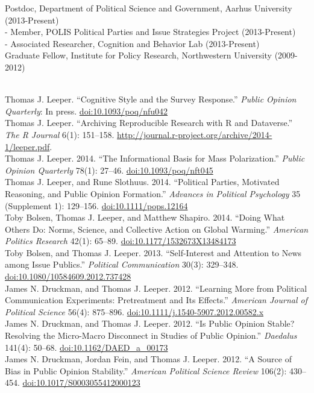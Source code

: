 \documentclass[12pt]{article}
\renewcommand{\section}[1]{\pagebreak[3]%
    \llap{\scshape\smash{\parbox[t]{\marginparwidth}{\raggedright {\color{lg}#1}}}}%
    \vspace{-\baselineskip}\par}
\newcommand{\topic}[1]{\pagebreak[3]\indent {\color{lg}{\footnotesize #1 }}\\}
\newcommand{\entry}[1]{\indent {\color{lg}\guillemotright}\hspace{2pt}#1\vspace{.25em}\\}
\newcommand{\subentry}[1]{{\color{lg}-} #1\vspace{.25em}\\}
\begin{document}
\section{Academic Appointments}
\entry{Postdoc, Department of Political Science and Government, Aarhus University (2013-Present)}
\subentry{Member, POLIS Political Parties and Issue Strategies Project (2013-Present)}
\subentry{Associated Researcher, Cognition and Behavior Lab (2013-Present)}
\entry{Graduate Fellow, Institute for Policy Research, Northwestern University (2009-2012)}

\section{Publications}
\topic{Peer-Reviewed Publications}
\entry{Thomas J. Leeper. ``Cognitive Style and the Survey Response.'' {\em Public Opinion Quarterly}: In press. \href{http://dx.doi.org/10.1093/poq/nfu042}{doi:10.1093/poq/nfu042}}
\entry{Thomas J. Leeper. ``Archiving Reproducible Research with R and Dataverse.'' {\em The R Journal} 6(1): 151--158. \href{http://journal.r-project.org/archive/2014-1/leeper.pdf}{http://journal.r-project.org/archive/2014-1/leeper.pdf}.}
\entry{Thomas J. Leeper. 2014. ``The Informational Basis for Mass Polarization.'' {\em Public Opinion Quarterly} 78(1): 27--46. \href{http://dx.doi.org/10.1093/poq/nft045}{doi:10.1093/poq/nft045}}
\entry{Thomas J. Leeper, and Rune Slothuus. 2014. ``Political Parties, Motivated Reasoning, and Public Opinion Formation.'' {\em Advances in Political Psychology} 35 (Supplement 1): 129--156. \href{http://dx.doi.org/10.1111/pops.12164}{doi:10.1111/pops.12164}}
\entry{Toby Bolsen, Thomas J. Leeper, and Matthew Shapiro. 2014. ``Doing What Others Do: Norms, Science, and Collective Action on Global Warming.'' {\em American Politics Research} 42(1): 65--89. \href{http://dx.doi.org/10.1177/1532673X13484173}{doi:10.1177/1532673X13484173}}
\entry{Toby Bolsen, and Thomas J. Leeper. 2013. ``Self-Interest and Attention to News among Issue Publics.'' {\em Political Communication} 30(3): 329--348.\\ \href{http://dx.doi.org/10.1080/10584609.2012.737428}{doi:10.1080/10584609.2012.737428}}
\entry{James N. Druckman, and Thomas J. Leeper. 2012. ``Learning More from Political Communication Experiments: Pretreatment and Its Effects.'' {\em American Journal of Political Science} 56(4): 875--896. \href{http://dx.doi.org/10.1111/j.1540-5907.2012.00582.x}{doi:10.1111/j.1540-5907.2012.00582.x}}
\entry{James N. Druckman, and Thomas J. Leeper. 2012. ``Is Public Opinion Stable? Resolving the Micro-Macro Disconnect in Studies of Public Opinion.'' {\em Daedalus} 141(4): 50--68. \href{http://dx.doi.org/10.1162/DAED\_a\_00173}{doi:10.1162/DAED\_a\_00173}}
\entry{James N. Druckman, Jordan Fein, and Thomas J. Leeper. 2012. ``A Source of Bias in Public Opinion Stability.'' {\em American Political Science Review} 106(2): 430--454. \href{http://dx.doi.org/10.1017/S0003055412000123}{doi:10.1017/S0003055412000123}}
\end{document}
